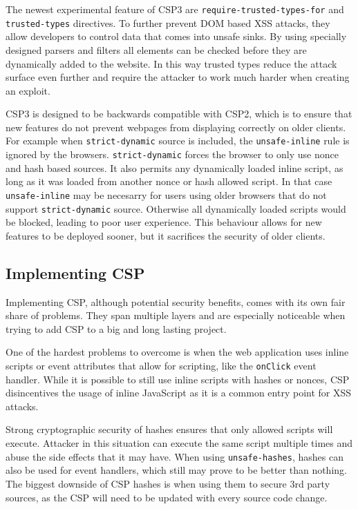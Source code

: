 The newest experimental feature of CSP3 are \texttt{require-trusted-types-for} and \texttt{trusted-types} directives. \cite{TTwebdev} \cite{TTmozdev}
To further prevent DOM based XSS attacks, they allow developers to control data that comes into unsafe sinks.
By using specially designed parsers and filters all elements can be checked before they are dynamically added to the website.
In this way trusted types reduce the attack surface even further and require the attacker to work much harder when creating an exploit.

CSP3 is designed to be backwards compatible with CSP2, which is to ensure that new features do not prevent webpages from displaying correctly on older clients.
For example when \texttt{strict-dynamic} source is included, the \texttt{unsafe-inline} rule is ignored by the browsers.
\texttt{strict-dynamic} forces the browser to only use nonce and hash based sources. 
It also permits any dynamically loaded inline script, as long as it was loaded from another nonce or hash allowed script.
In that case \texttt{unsafe-inline} may be necesarry for users using older browsers that do not support \texttt{strict-dynamic} source.
Otherwise all dynamically loaded scripts would be blocked, leading to poor user experience.
This behaviour allows for new features to be deployed sooner, but it sacrifices the security of older clients.


\subsection{Implementing CSP}
Implementing CSP, although potential security benefits, comes with its own fair share of problems. 
They span multiple layers and are especially noticeable when trying to add CSP to a big and long lasting project.

One of the hardest problems to overcome is when the web application uses inline scripts or event attributes that allow for scripting, like the \texttt{onClick} event handler.
While it is possible to still use inline scripts with hashes or nonces, CSP disincentives the usage of inline JavaScript as it is a common entry point for XSS attacks. 

Strong cryptographic security of hashes ensures that only allowed scripts will execute. 
Attacker in this situation can execute the same script multiple times and abuse the side effects that it may have.
When using \texttt{unsafe-hashes}, hashes can also be used for event handlers, which still may prove to be better than nothing.
The biggest downside of CSP hashes is when using them to secure 3rd party sources, as the CSP will need to be updated with every source code change.

